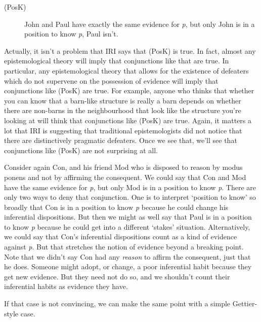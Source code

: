 \documentclass[
  10pt,
  letterpaper,
  DIV=11,
  numbers=noendperiod,
  twoside]{scrartcl}
\begin{document}
\begin{description}
\item[(PosK)]
John and Paul have exactly the same evidence for \emph{p}, but only John
is in a position to know \emph{p}, Paul isn't.
\end{description}

Actually, it isn't a problem that IRI says that (PosK) is true. In fact,
almost any epistemological theory will imply that conjunctions like that
are true. In particular, any epistemological theory that allows for the
existence of defeaters which do not supervene on the possession of
evidence will imply that conjunctions like (PosK) are true. For example,
anyone who thinks that whether you can know that a barn-like structure
is really a barn depends on whether there are non-barns in the
neighbourhood that look like the structure you're looking at will think
that conjunctions like (PosK) are true. Again, it matters a lot that IRI
is suggesting that traditional epistemologists did not notice that there
are distinctively pragmatic defeaters. Once we see that, we'll see that
conjunctions like (PosK) are not surprising at all.

Consider again Con, and his friend Mod who is disposed to reason by
modus ponens and not by affirming the consequent. We could say that Con
and Mod have the same evidence for \emph{p}, but only Mod is in a
position to know \emph{p}. There are only two ways to deny that
conjunction. One is to interpret `position to know' so broadly that Con
is in a position to know \emph{p} because he could change his
inferential dispositions. But then we might as well say that Paul is in
a position to know \emph{p} because he could get into a different
`stakes' situation. Alternatively, we could say that Con's inferential
dispositions count as a kind of evidence against \emph{p}. But that
stretches the notion of evidence beyond a breaking point. Note that we
didn't say Con had any \emph{reason} to affirm the consequent, just that
he does. Someone might adopt, or change, a poor inferential habit
because they get new evidence. But they need not do so, and we shouldn't
count their inferential habits as evidence they have.

If that case is not convincing, we can make the same point with a simple
Gettier-style case.
\end{document}
